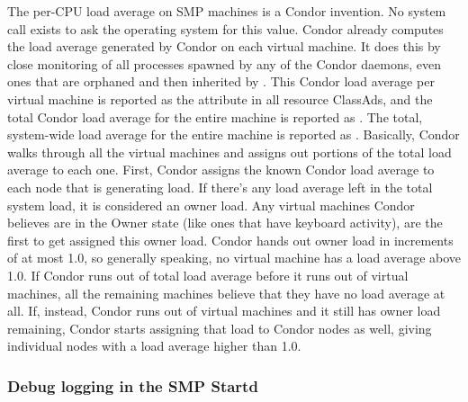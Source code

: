 The per-CPU load average on SMP machines is a Condor invention. 
No system call exists to ask the operating system for this value.
Condor already computes the load average generated by Condor on each
virtual machine.
It does this by close monitoring of all processes spawned by any of the
Condor daemons, even ones that are orphaned and then inherited by
. 
This Condor load average per virtual machine is reported as
the attribute
 in all resource ClassAds, and the total Condor
load average for the entire machine is reported as
. 
The total, system-wide load average for the entire
machine  is reported as .
Basically, Condor walks through all the virtual machines and assigns out
portions of the total load average to each one. 
First, Condor assigns the known Condor load average to each node that
is generating load.  
If there's any load average left in the total system load, it is
considered an owner load.
Any virtual machines Condor believes are in the Owner state (like
ones that have keyboard activity), are the first to get assigned
this owner load.
Condor hands out owner load in increments of at most 1.0, so generally
speaking, no virtual machine has a load average above 1.0.
If Condor runs out of total load average before it runs out of virtual
machines, all the remaining machines believe that they have no load average
at all.
If, instead, Condor runs out of virtual machines and it still has owner
load remaining, Condor starts assigning that load to Condor nodes as
well,
giving individual nodes with a load average higher than 1.0.


\subsubsection{\label{sec:SMP-logging}
Debug logging in the SMP Startd}

